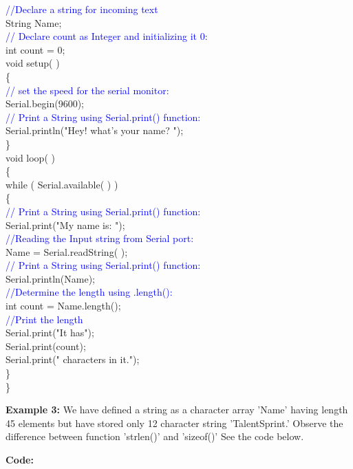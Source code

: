 \documentclass[12pt,a4paper]{article}
\begin{document}
\textcolor{blue}{//Declare a string for incoming text}\\
String Name;\\
\textcolor{blue}{// Declare count as Integer and initializing it 0:} \\ 
int count = 0;\\[6pt]
void setup( )\\
\{\\
 \textcolor{blue}{// set the speed for the serial monitor:}\\
 Serial.begin(9600);\\
\textcolor{blue}{ // Print a String using Serial.print() function:}\\
 Serial.println("Hey! what's your name? ");\\
\}\\[6pt]
void loop( )\\
\{\\
  while ( Serial.available( ) )\\
  \{\\
  \textcolor{blue}{ // Print a String using Serial.print() function:}\\
   Serial.print("My name is: ");\\
  \textcolor{blue}{//Reading the Input string from Serial port:}\\
  Name = Serial.readString( );\\
  \textcolor{blue}{// Print a String using Serial.print() function:}\\
  Serial.println(Name);\\
  \textcolor{blue}{//Determine the length using .length():}\\
   int count = Name.length();\\
  \textcolor{blue}{//Print the length}\\
 Serial.print("It has");\\
 Serial.print(count);\\
 Serial.print(" characters in it.");\\
  \}\\
\}\\

\setlength{\parindent}{0eM}
\begin{justify}
\noindent \textbf{Example 3:} We have defined a string as a character array 'Name' having length 45 elements but have stored only 12 character string 'TalentSprint.' Observe the difference between function 'strlen()' and 'sizeof()' See the code below.\end{justify}
\vspace{-5mm}
\hspace{1.5cm}\textbf{\large Code:}\\[6pt]
\setlength{\parindent}{8eM}
\end{document}
